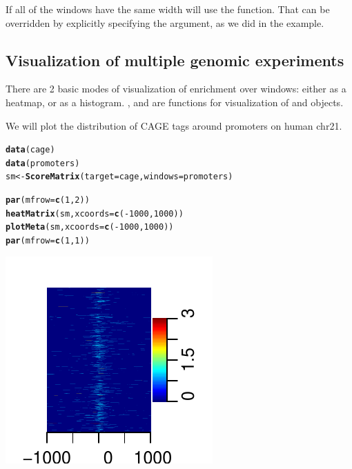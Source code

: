 \documentclass{article}\usepackage[]{graphicx}\usepackage[]{color}
\makeatletter
\newcommand{\hlnum}[1]{\textcolor[rgb]{0.686,0.059,0.569}{#1}}%
\newcommand{\hlopt}[1]{\textcolor[rgb]{0,0,0}{#1}}%
\newcommand{\hlstd}[1]{\textcolor[rgb]{0.345,0.345,0.345}{#1}}%
\newcommand{\hlkwb}[1]{\textcolor[rgb]{0.69,0.353,0.396}{#1}}%
\newcommand{\hlkwc}[1]{\textcolor[rgb]{0.333,0.667,0.333}{#1}}%
\newcommand{\hlkwd}[1]{\textcolor[rgb]{0.737,0.353,0.396}{\textbf{#1}}}%
\newenvironment{kframe}{%
 \def\at@end@of@kframe{}%
 \ifinner\ifhmode%
  \def\at@end@of@kframe{\end{minipage}}%
  \begin{minipage}{\columnwidth}%
 \fi\fi%
 \def\FrameCommand##1{\hskip\@totalleftmargin \hskip-\fboxsep
 \colorbox{shadecolor}{##1}\hskip-\fboxsep
     \hskip-\linewidth \hskip-\@totalleftmargin \hskip\columnwidth}%
 \MakeFramed {\advance\hsize-\width
   \@totalleftmargin\z@ \linewidth\hsize
   \@setminipage}}%
 {\par\unskip\endMakeFramed%
 \at@end@of@kframe}
\newenvironment{knitrout}{}{} %
\makeatother
\begin{document}
If all of the windows have the same width  will use the
 function. That can be overridden by explicitly specifying the 
 argument, as we did in the example.
\\

\subsection{Visualization of multiple genomic experiments}

There are 2 basic modes of visualization of enrichment over windows: either as a heatmap, 
or as a histogram. \Rcode{heatMatrix]},  and  are functions for visualization of  and  objects.

We will plot the distribution of CAGE tags around promoters on human chr21.
\begin{knitrout}
\color{fgcolor}\begin{kframe}
\begin{alltt}
\hlkwd{data}\hlstd{(cage)}
\hlkwd{data}\hlstd{(promoters)}
\hlstd{sm} \hlkwb{<-} \hlkwd{ScoreMatrix}\hlstd{(}\hlkwc{target} \hlstd{= cage,} \hlkwc{windows} \hlstd{= promoters)}

\hlkwd{par}\hlstd{(}\hlkwc{mfrow} \hlstd{=} \hlkwd{c}\hlstd{(}\hlnum{1}\hlstd{,} \hlnum{2}\hlstd{))}
\hlkwd{heatMatrix}\hlstd{(sm,} \hlkwc{xcoords} \hlstd{=} \hlkwd{c}\hlstd{(}\hlopt{-}\hlnum{1000}\hlstd{,} \hlnum{1000}\hlstd{))}
\hlkwd{plotMeta}\hlstd{(sm,} \hlkwc{xcoords} \hlstd{=} \hlkwd{c}\hlstd{(}\hlopt{-}\hlnum{1000}\hlstd{,} \hlnum{1000}\hlstd{))}
\hlkwd{par}\hlstd{(}\hlkwc{mfrow} \hlstd{=} \hlkwd{c}\hlstd{(}\hlnum{1}\hlstd{,} \hlnum{1}\hlstd{))}
\end{alltt}
\end{kframe}

{\centering \includegraphics[width=.49\linewidth]{inst/doc/FiguresheatMatrix1} 

}



\end{knitrout}
\end{document}
